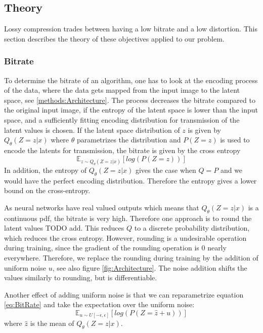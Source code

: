 \subsection{Theory}
    Lossy compression trades between having a low bitrate and a low distortion.
    This section describes the theory of these objectives applied to our
    problem.\newline

    \subsubsection{Bitrate}
        To determine the bitrate of an algorithm, one has to look at the encoding
        process of the data, where the data gets mapped from the input image to the
        latent space, see \ref{methods:Architecture}. The process decreases the
        bitrate compared to the original input image, if the entropy of the latent
        space is lower than the input space, and a sufficiently fitting encoding
        distribution for transmission of the latent values is chosen. If the latent
        space distribution of $z$ is given by $Q_\theta(Z=z \vert x)$ where $\theta$
        parametrizes the distribution and $P(Z=z)$ is used to encode the latents for
        transmission, the bitrate is given by the cross entropy
        \begin{equation}\label{eq:BitRate}
            \mathbb{E}_{z \sim Q_\theta(Z=z \vert x)}[log(P(Z=z))]
        \end{equation}
        In addition, the entropy of $Q_\theta(Z=z \vert x)$ gives the case when
        $Q=P$ and we would have the perfect encoding distribution. Therefore the
        entropy gives a lower bound on the cross-entropy.

        As neural networks have real valued outputs which means that $Q_\theta(Z=z
        \vert x)$ is a continuous pdf, the bitrate is very high. Therefore one
        approach is to round the latent values TODO add. This reduces $Q$ to a discrete
        probability distribution, which reduces the cross entropy. However, rounding
        is a undesirable operation during training, since the gradient of the
        rounding operation is 0 nearly everywhere. Therefore, we replace the
        rounding during training by the addition of uniform noise $u$, see also
        figure \ref{fig:Architecture}. The noise addition shifts the values
        similarly to rounding, but is differentiable.

        Another effect of adding uniform noise is that we can reparametrize equation
        \ref{eq:BitRate} and take the expectation over the uniform noise:
        \begin{equation}
            \mathbb{E}_{u \sim U[-\epsilon, \epsilon]}[log(P(Z=\hat{z} + u))]
        \end{equation}
        where $\hat{z}$ is the mean of $Q_\theta(Z=z \vert x)$. \newline

